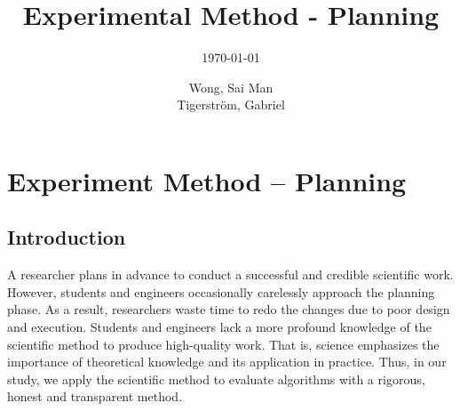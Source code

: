 \documentclass[a4paper,11pt]{kth-mag}
\title{Experimental Method - Planning}
\subtitle{\today}
\author{Wong, Sai Man\\ Tigerstr\"{o}m, Gabriel}
\begin{document}
\frontmatter
\pagestyle{empty}
\removepagenumbers
\maketitle
{}



{
      \hypersetup{linkcolor=black}
      \tableofcontents*
}
\mainmatter
\pagestyle{newchap}



\chapter{Experiment Method -- Planning}
\section{Introduction}\label{sec:intro}
A researcher plans in advance to conduct a successful and credible scientific work.
However, students and engineers occasionally carelessly approach the planning phase.
As a result, researchers waste time to redo the changes due to poor design and execution.
Students and engineers lack a more profound knowledge of the scientific method to produce high-quality work.
That is, science emphasizes the importance of theoretical knowledge and its application in practice.
Thus, in our study, we apply the scientific method to evaluate algorithms with a rigorous, honest and transparent method.
\end{document}
